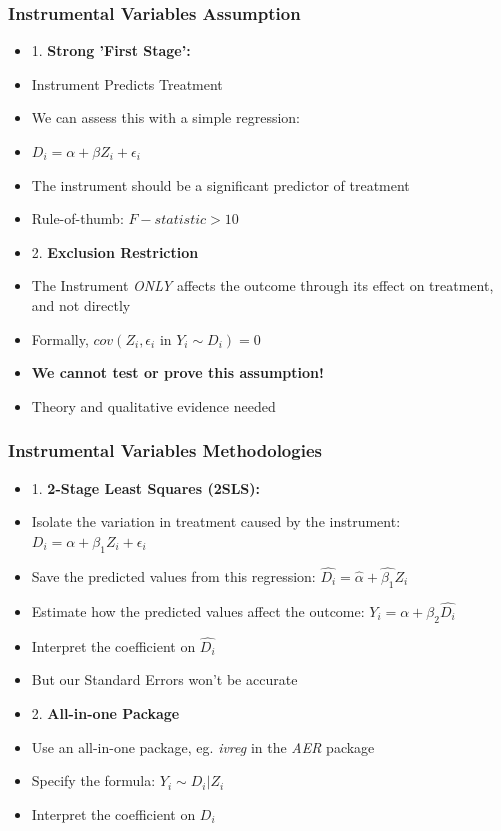 \documentclass[xcolor=x11names,compress]{beamer}\usepackage[]{graphicx}\usepackage[]{color}
\renewcommand{\(}{\begin{columns}}
\renewcommand{\)}{\end{columns}}
\newcommand{\<}[1]{\begin{column}{#1}}
\renewcommand{\>}{\end{column}}
\begin{document}
\begin{frame}
\frametitle{Instrumental Variables Assumption}
\begin{multicols}{2}
\begin{itemize}
\item 1. \textbf{Strong 'First Stage':}
\pause
\item Instrument Predicts Treatment
\pause
\item We can assess this with a simple regression:
\pause
\item $D_i = \alpha + \beta Z_i + \epsilon_i$
\pause
\item The instrument should be a significant predictor of treatment
\pause
\item Rule-of-thumb: $F-statistic > 10$
\end{itemize}
\columnbreak
\begin{itemize}
\item 2. \textbf{Exclusion Restriction} 
\pause
\item The Instrument \textit{ONLY} affects the outcome through its effect on treatment, and not directly
\pause
\item Formally, $cov(Z_i, \epsilon_i \text{ in } Y_i \sim D_i)=0$
\pause
\item \textbf{We cannot test or prove this assumption!}
\pause
\item Theory and qualitative evidence needed
\end{itemize}
\end{multicols}
\end{frame}

\begin{frame}
\frametitle{Instrumental Variables Methodologies}
\begin{multicols}{2}
\begin{itemize}
\item 1. \textbf{2-Stage Least Squares (2SLS):}
\pause
\item Isolate the variation in treatment caused by the instrument: $D_i = \alpha + \beta_1 Z_i + \epsilon_i$
\pause
\item Save the predicted values from this regression: $\hat{D_i} = \hat{\alpha} + \hat{\beta_1} Z_i$
\pause
\item Estimate how the predicted values affect the outcome: $Y_i = \alpha + \beta_2 \hat{D_i}$
\pause
\item Interpret the coefficient on $\hat{D_i}$
\pause
\item But our Standard Errors won't be accurate
\end{itemize}
\columnbreak
\begin{itemize}
\item 2. \textbf{All-in-one Package} 
\pause
\item Use an all-in-one package, eg. \textit{ivreg} in the \textit{AER} package
\pause
\item Specify the formula: $Y_i \sim D_i | Z_i$
\pause
\item Interpret the coefficient on $D_i$
\end{itemize}
\end{multicols}
\end{frame}
\end{document}
